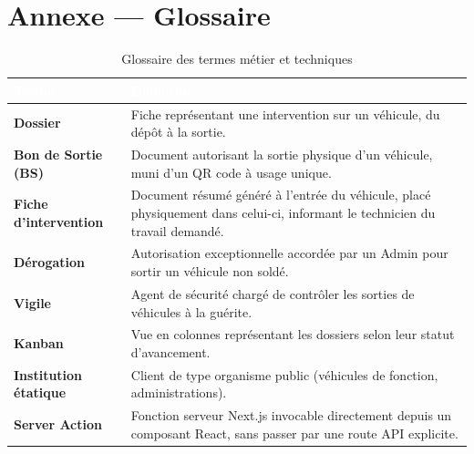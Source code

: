 \documentclass[11pt,a4paper]{report}
\begin{document}
\chapter{Annexe --- Glossaire}

\begin{table}[h!]
\centering
{}
\begin{tabularx}{\linewidth}{@{}l>{\raggedright\arraybackslash}X@{}}
\toprule
\rowcolor{km0blue}
\textcolor{white}{\textbf{Terme}} & \textcolor{white}{\textbf{Définition}} \\
\midrule
\textbf{Dossier} & Fiche représentant une intervention sur un véhicule, du dépôt à la sortie. \\
\textbf{Bon de Sortie (BS)} & Document autorisant la sortie physique d'un véhicule, muni d'un QR code à usage unique. \\
\textbf{Fiche d'intervention} & Document résumé généré à l'entrée du véhicule, placé physiquement dans celui-ci, informant le technicien du travail demandé. \\
\textbf{Dérogation} & Autorisation exceptionnelle accordée par un Admin pour sortir un véhicule non soldé. \\
\textbf{Vigile} & Agent de sécurité chargé de contrôler les sorties de véhicules à la guérite. \\
\textbf{Kanban} & Vue en colonnes représentant les dossiers selon leur statut d'avancement. \\
\textbf{Institution étatique} & Client de type organisme public (véhicules de fonction, administrations). \\
\textbf{Server Action} & Fonction serveur Next.js invocable directement depuis un composant React, sans passer par une route API explicite. \\
\bottomrule
\end{tabularx}
\caption{Glossaire des termes métier et techniques}
\end{table}
\end{document}
